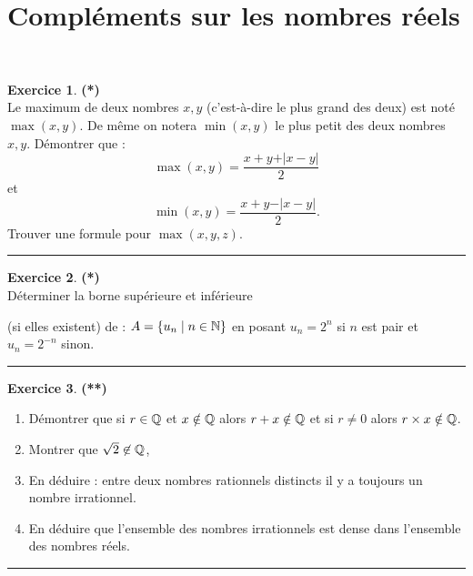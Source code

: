 \documentclass[a4paper,11pt]{article}
\theoremstyle{definition}
\newtheorem{exo}{Exercice} %
\begin{document}
\section*{Compléments sur les nombres réels}\hfill\\%
\begin{minipage}{1\linewidth}
	\begin{minipage}[c]{0.48\linewidth}
		\raggedright
		
		

		
		
		\begin{exo}\textbf{(*)}\quad\\[0.2cm]
			Le maximum de deux nombres $x,y$ (c'est-\`a-dire le plus grand des
			deux) est not\'e $\max(x,y)$. De m\^eme on notera $\min(x,y)$ le plus petit des deux nombres
			$x,y$. D\'emontrer que :
			$$ \max(x,y)= \frac{x+y+ \vert x-y\vert}{ 2}$$ \quad \hbox{et}\quad $$ \min(x,y)= \frac{x+y- \vert
				x-y\vert}{ 2}. $$
			Trouver une formule pour $\max(x,y,z)$.
			
			\centering
			\rule{1\linewidth}{0.6pt}
		\end{exo}
		
		\begin{exo}\textbf{(*)}\quad\\[0.2cm]
			D{\'e}terminer la borne sup{\'e}rieure et inf{\'e}rieure
			
			
			(si elles existent) de : $A=\{u_n \mid n\in\mathbb{N}\}$ en posant
			$u_n=2^n$ si $n$ est pair et  $u_n=2^{-n}$ sinon.
			
			\centering
			\rule{1\linewidth}{0.6pt}
		\end{exo}
		
				\begin{exo}\textbf{(**)}\quad\\[0.2cm]
			\begin{enumerate}
				\item D\'emontrer que si $r \in \mathbb{Q}$ et $ x \notin \mathbb{Q} $ alors $ r+x
				\notin \mathbb{Q} $ et si $r\not= 0$ alors $ r\times x \notin \mathbb{Q} $.
				\item Montrer que $\sqrt 2 \not\in\mathbb{Q}$,
				\item En d\'eduire : entre deux nombres rationnels distincts il y a toujours un nombre irrationnel.
				\item En déduire que l'ensemble des nombres irrationnels est dense dans l'ensemble des nombres réels. 
			\end{enumerate}
			\centering
			\rule{1\linewidth}{0.6pt}
		\end{exo}
		

\end{minipage}
\end{minipage}
\end{document}
